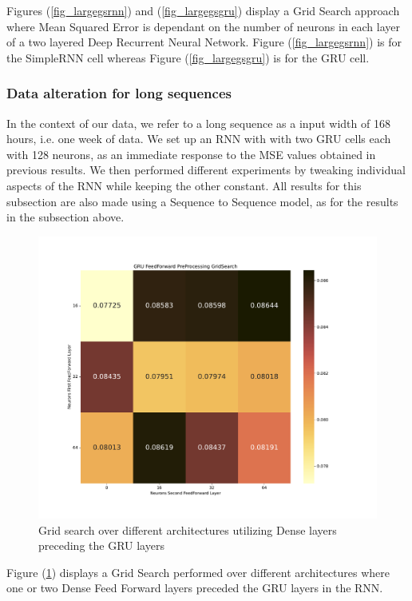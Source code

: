 \documentclass
[twocolumn,
secnumarabic,
nobibnotes,
aps,
prl,
reprint,
groupedaddress,
amsmath,
amssymb,
]{revtex4-2}
\begin{document}
Figures (\ref{fig_largegsrnn}) and (\ref{fig_largegsgru}) display a Grid Search approach where Mean Squared Error is dependant on the number of neurons in each layer of a two layered Deep Recurrent Neural Network. Figure (\ref{fig_largegsrnn}) is for the SimpleRNN cell whereas Figure (\ref{fig_largegsgru}) is for the GRU cell. 

\subsubsection{Data alteration for long sequences}
In the context of our data, we refer to a long sequence as a input width of 168 hours, i.e. one week of data. We set up an RNN with with two GRU cells each with 128 neurons, as an immediate response to the MSE values obtained in previous results. We then performed different experiments by tweaking individual aspects of the RNN while keeping the other constant. All results for this subsection are also made using a Sequence to Sequence model, as for the results in the subsection above.

\begin{figure}
  \includegraphics[width=.725\textwidth]{figures/Large_forecast_ff_gridsearch_gru.pdf}
  \caption{\label{fig_gsff}Grid search over different architectures utilizing Dense layers preceding the GRU layers}
\end{figure}

Figure (\ref{fig_gsff}) displays a Grid Search performed over different architectures where one or two Dense Feed Forward layers preceded the GRU layers in the RNN.
\end{document}
